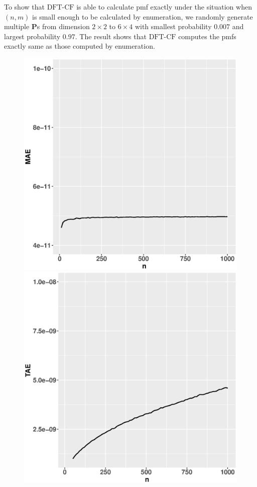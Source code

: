 \documentclass[12pt]{article}
\newcommand{\Pmat}{\mathbf{P}}
\newcommand{\dft}{{\textrm{DFT-CF}}}
\begin{document}
To show that $\dft$ is able to calculate pmf exactly under the situation when $(n,m)$ is small enough to be calculated by enumeration, we randomly generate multiple $\Pmat$s from dimension $2 \times 2$ to $6 \times 4$ with smallest probability $0.007$ and largest probability $0.97$. The result shows that $\dft$ computes the pmfs exactly same as those computed by enumeration.
\begin{figure}
    \centering
    \begin{minipage}{0.45\textwidth}
        \centering
        \includegraphics[width=1\textwidth]{figures/poi_mae.eps} 
    \end{minipage}\hfill
    \begin{minipage}{0.45\textwidth}
        \centering
        \includegraphics[width=1\textwidth]{figures/poi_tae.eps} 

\end{minipage}
\end{figure}
\end{document}
